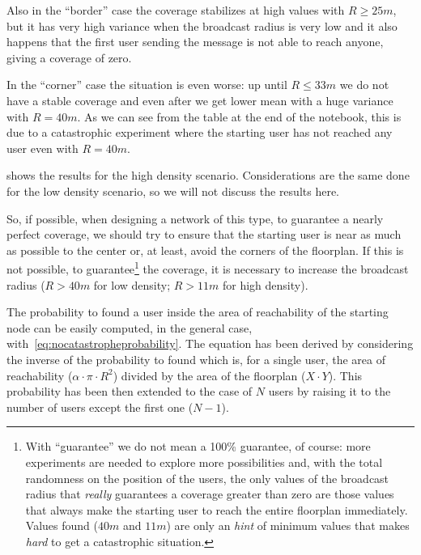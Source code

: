 Also in the ``border'' case the coverage stabilizes at high values with \(R \ge
25m\), but it has very high variance when the broadcast radius is very low and
it also happens that the first user sending the message is not able to reach
anyone, giving a coverage of zero.

In the ``corner'' case the situation is even worse: up until \(R \le 33m\) we
do not have a stable coverage and even after we get lower mean with a huge
variance with \(R\!=\!40m\). As we can see from the table at the end of the
notebook, this is due to a catastrophic experiment where the starting user has
not reached any user even with \(R\!=\!40m\).

 shows the results for the high density
scenario. Considerations are the same done for the low density scenario, so we
will not discuss the results here.

So, if possible, when designing a network of this type, to guarantee a nearly
perfect coverage, we should try to ensure that the starting user is near as much
as possible to the center or, at least, avoid the corners of the floorplan. If
this is not possible, to guarantee\footnote{With ``guarantee'' we do not mean a
100\% guarantee, of course: more experiments are needed to explore more
possibilities and, with the total randomness on the position of the users, the
only values of the broadcast radius that \emph{really} guarantees a coverage
greater than zero are those values that always make the starting user to reach
the entire floorplan immediately. Values found (\(40m\) and \(11m\)) are only an
\emph{hint} of minimum values that makes \emph{hard} to get a catastrophic
situation.} the coverage, it is necessary to increase the broadcast radius (\(R
> 40m\) for low density; \(R > 11m\) for high density).

The probability to found a user inside the area of reachability of the starting
node  can be easily
computed, in the general case, with~\eqref{eq:nocatastropheprobability}. The
equation has been derived by considering the inverse of the probability to found
 which is, for a single user, the area of reachability
(\(\alpha\cdot\pi\cdot R^2\)) divided by the area of the floorplan (\(X\cdot
Y\)). This probability has been then extended to the case of \(N\) users by
raising it to the number of users except the first one (\(N-1\)).

